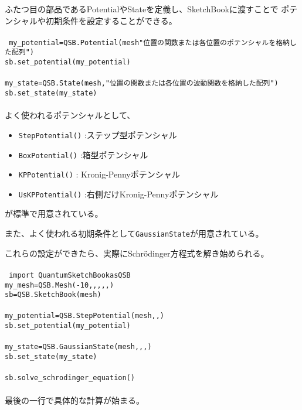 \documentclass[autodetect-engine,dvipdfmx-if-dvi,ja=standard,a4paper,layout=v2]{bxjsreport}
\begin{document}
    ふたつ目の部品であるPotentialやStateを定義し、SketchBookに渡すことで
    ポテンシャルや初期条件を設定することができる。\\\\
    \texttt{
      my\_potential\:=\:QSB.Potential(mesh\:"位置の関数または各位置のポテンシャルを格納した配列")\\
      sb.set\_potential(my\_potential)\\\\
      my\_state\:=\:QSB.State(mesh,\:"位置の関数または各位置の波動関数を格納した配列")\\
      sb.set\_state(my\_state)\\
    }\\
    よく使われるポテンシャルとして、
    \begin{itemize}
    \item \texttt{StepPotential()}\: :ステップ型ポテンシャル
    \item \texttt{BoxPotential()}\: :箱型ポテンシャル
    \item \texttt{KPPotential()}\: : Kronig-Pennyポテンシャル
    \item \texttt{UsKPPotential()}\: :右側だけKronig-Pennyポテンシャル
    \end{itemize}
    が標準で用意されている。\par
    また、よく使われる初期条件として\texttt{GaussianState}が用意されている。\par
    これらの設定ができたら、実際にSchrödinger方程式を解き始められる。\\\\
    \texttt{
      import \:QuantumSketchBook\:as\:QSB\\
      my\_mesh\:=\:QSB.Mesh(-10,,,,,)\\
      sb\:=\:QSB.SketchBook(mesh)\\\\
      my\_potential\:=\:QSB.StepPotential(mesh,,)\\
      sb.set\_potential(my\_potential)\\\\
      my\_state\:=\:QSB.GaussianState(mesh,,,)\\
      sb.set\_state(my\_state)\\\\
      sb.solve\_schrodinger\_equation()\\
    }\\
    最後の一行で具体的な計算が始まる。\par
\end{document}
